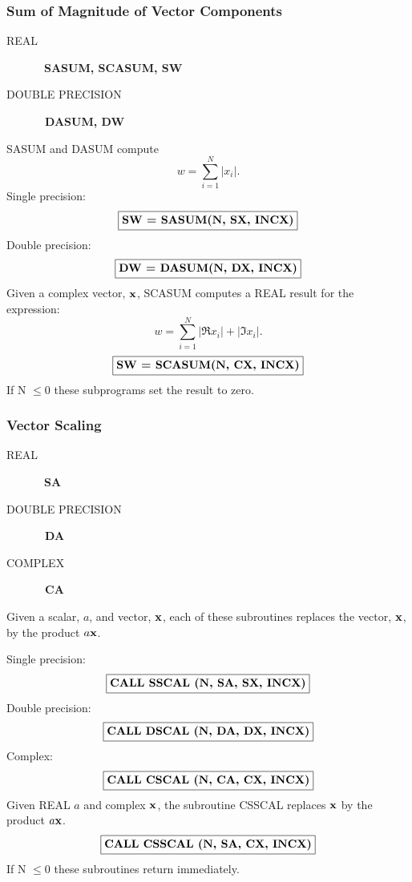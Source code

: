 \documentclass[twoside]{MATH77}
\begin{document}
\subsubsection{Sum of Magnitude of Vector Components\label{B11}}
\begin{description}
\item[REAL]  \ {\bf SASUM, SCASUM, SW }

\item[DOUBLE PRECISION]  {\bf \ DASUM, DW }
\end{description}
SASUM and DASUM compute%
\begin{equation*}
w=\sum_{i=1}^N|x_i|.
\end{equation*}
Single precision:
$$
\fbox{{\bf SW = SASUM(N, SX, INCX)}}
$$
Double precision:
$$
\fbox{{\bf DW = DASUM(N, DX, INCX)}}
$$
Given a complex vector, ${\bf x}$, SCASUM computes a REAL result for the
expression:%
\begin{equation*}
w=\sum_{i=1}^N|\Re x_i|+|\Im x_i|.
\end{equation*}
$$
\fbox{{\bf SW = SCASUM(N, CX, INCX)}}
$$
If N $\leq 0$ these subprograms set the result to zero.

\subsubsection{Vector Scaling\label{B12}}
\begin{description}
\item[REAL]  \ {\bf SA }

\item[DOUBLE PRECISION]  {\bf \ DA }

\item[COMPLEX]  {\bf \ CA }
\end{description}
Given a scalar, $a$, and vector, ${\bf x}$, each of these subroutines replaces
the vector, ${\bf x}$, by the product $a{\bf x}$.

Single precision:
$$
\fbox{{\bf CALL SSCAL (N, SA, SX, INCX)}}
$$
Double precision:
$$
\fbox{{\bf CALL DSCAL (N, DA, DX, INCX)}}
$$
Complex:
$$
\fbox{{\bf CALL CSCAL (N, CA, CX, INCX)}}
$$
Given REAL $a$ and complex ${\bf x}$, the subroutine CSSCAL replaces ${\bf x}$
by the product $a{\bf x}$.
$$
\fbox{{\bf CALL CSSCAL (N, SA, CX, INCX)}}
$$
If N $\leq 0$ these subroutines return immediately.
\end{document}
